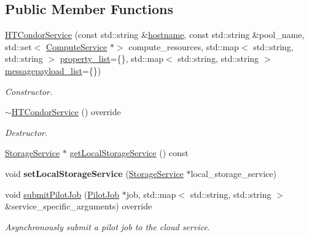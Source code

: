 \subsection*{Public Member Functions}
\begin{DoxyCompactItemize}
\item 
\hyperlink{classwrench_1_1_h_t_condor_service_a4632c26bb4c08757ac2ceeb57cd8e2d3}{H\+T\+Condor\+Service} (const std\+::string \&\hyperlink{classwrench_1_1_s4_u___daemon_a52bc0b9a6cd248310749dac086819f00}{hostname}, const std\+::string \&pool\+\_\+name, std\+::set$<$ \hyperlink{classwrench_1_1_compute_service}{Compute\+Service} $\ast$$>$ compute\+\_\+resources, std\+::map$<$ std\+::string, std\+::string $>$ \hyperlink{classwrench_1_1_service_a032143b1e2d7296dde9b4ca1e34845ce}{property\+\_\+list}=\{\}, std\+::map$<$ std\+::string, std\+::string $>$ \hyperlink{classwrench_1_1_service_a63865f20c92027ab626ab1347b0099d2}{messagepayload\+\_\+list}=\{\})
\begin{DoxyCompactList}\small\item\em Constructor. \end{DoxyCompactList}\item 
\mbox{\label{classwrench_1_1_h_t_condor_service_a0b8eeb37bbbc61f3906266fc9d34d136}} 
\hyperlink{classwrench_1_1_h_t_condor_service_a0b8eeb37bbbc61f3906266fc9d34d136}{$\sim$\+H\+T\+Condor\+Service} () override
\begin{DoxyCompactList}\small\item\em Destructor. \end{DoxyCompactList}\item 
\hyperlink{classwrench_1_1_storage_service}{Storage\+Service} $\ast$ \hyperlink{classwrench_1_1_h_t_condor_service_a4c8a4111afff9952e90d210a8b0bdf35}{get\+Local\+Storage\+Service} () const
\item 
\mbox{\label{classwrench_1_1_h_t_condor_service_a21750683c0445a8d208ef3862a2cea21}} 
void {\bfseries set\+Local\+Storage\+Service} (\hyperlink{classwrench_1_1_storage_service}{Storage\+Service} $\ast$local\+\_\+storage\+\_\+service)
\item 
void \hyperlink{classwrench_1_1_h_t_condor_service_a1fac4517c82ac0b0737cd6ca75bba952}{submit\+Pilot\+Job} (\hyperlink{classwrench_1_1_pilot_job}{Pilot\+Job} $\ast$job, std\+::map$<$ std\+::string, std\+::string $>$ \&service\+\_\+specific\+\_\+arguments) override
\begin{DoxyCompactList}\small\item\em Asynchronously submit a pilot job to the cloud service. \end{DoxyCompactList}\item 
$$
\end{DoxyCompactItemize}
